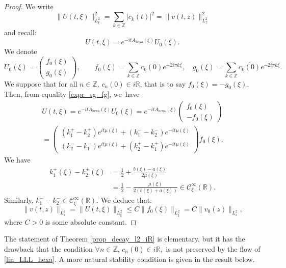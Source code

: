 \documentclass[10pt]{amsart}
\theoremstyle{definition}
\newcommand\R{\mathbb R}
\newcommand\Z{\mathbb Z}
\begin{document}
\begin{proof}
We write
\begin{equation*}
\|{U}(t,\xi) \|^2_{L_\xi^2} = \sum_{k\in\Z} |c_k(t)|^2 = \|v(t,z)\|^2_{L^2_z}
\end{equation*}
and recall:
\[
{U}(t,\xi) = e^{-itA_{\mathrm{hexa}}(\xi) }{U_0}(\xi).
\]
We denote
\[
{U_0}(\xi) = \begin{pmatrix} {f}_0(\xi) \\ {g}_0(\xi)\end{pmatrix}, \qquad {f}_0(\xi) = \sum_{k\in\Z} c_k(0)e^{- 2i\pi k \xi}, \quad {g}_0(\xi) = \sum_{k\in\Z} \overline{c_k(0)}e^{- 2i\pi k \xi}.
\]
We suppose that for all $n \in \Z, \, c_n(0) \in i\R$, that is to say ${f}_0(\xi) = -{g}_0(\xi)$. Then, from equality \eqref{expr_sg_fg}, we~have
\begin{multline*}
{U}(t,\xi)= e^{-itA_{\mathrm{hexa}}(\xi) }{U_0}(\xi) = e^{-it A_{\mathrm{hexa}}(\xi) }\begin{pmatrix} {f}_0(\xi) \\[2pt] -{f}_0(\xi) \end{pmatrix} \\
=\begin{pmatrix} (k_1^{+}-k_{2}^{+})e^{it\mu(\xi)} + (k_{1}^{-}-k_2^{-})e^{-it\mu(\xi)} \\[4pt] (k_2^{-}-k_1^{-})e^{it\mu(\xi)} + (k_{2}^{+}-k_{1}^{+})e^{-it\mu(\xi)}\end{pmatrix}{f}_0(\xi).
\end{multline*}
We have
\begin{align*}
k_1^{+}(\xi)-k_{2}^{+}(\xi) & = \frac12 + \frac{b(\xi)-a(\xi)}{2\mu(\xi)} \\[4pt]
& = \frac12 - \frac{\mu(\xi)}{2(b(\xi)+a(\xi))} \in \mathcal{C}_{\xi}^\infty(\R).
\end{align*}
Similarly, $k_1^{-}-k_{2}^{-}\in \mathcal{C}_{\xi}^\infty(\R)$.
We deduce that:
\begin{equation*}
\| v(t,z)\|_{L_z^2} = \|{U}(t,\xi) \|_{L_\xi^2} \leq C\|{f}_0(\xi)\|_{L_\xi^2} = C \|v_0(z)\|_{L_z^2},
\end{equation*}
where $C > 0$ is some absolute constant.
\end{proof}

The statement of Theorem \ref{prop_decay_l2_iR} is elementary, but it has the drawback that the condition $ \forall n \in \Z$, $c_n(0) \in i\R, $ is not preserved by the flow of \eqref{lin_LLL_hexa}. A more natural stability condition is given in the result below.
\end{document}
